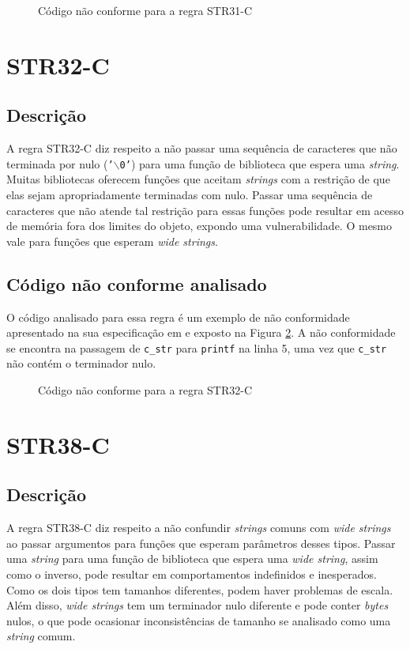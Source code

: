 \begin{figure}[h!]
  \centering
  
  \caption{Código não conforme para a regra STR31-C}
\label{fig:STR31-C}
\end{figure}

\section{STR32-C}
\subsection{Descrição}

A regra STR32-C diz respeito a não passar uma sequência de caracteres que não terminada por nulo (\texttt{'$\backslash$0'}) para uma função de biblioteca que espera uma \textit{string}. Muitas bibliotecas oferecem funções que aceitam \textit{strings} com a restrição de que elas sejam apropriadamente terminadas com nulo. Passar uma sequência de caracteres que não atende tal restrição para essas funções pode resultar em acesso de memória fora dos limites do objeto, expondo uma vulnerabilidade. O mesmo vale para funções que esperam \textit{wide strings}.

\subsection{Código não conforme analisado}

O código analisado para essa regra é um exemplo de não conformidade apresentado na sua especificação em \cite{ccert} e exposto na Figura \ref{fig:STR32-C}. A não conformidade se encontra na passagem de \texttt{c\_str} para \texttt{printf} na linha 5, uma vez que \texttt{c\_str} não contém o terminador nulo.

\begin{figure}[h!]
  \centering
  
  \caption{Código não conforme para a regra STR32-C}
\label{fig:STR32-C}
\end{figure}

\section{STR38-C}
\subsection{Descrição}

A regra STR38-C diz respeito a não confundir \textit{strings} comuns com \textit{wide strings} ao passar argumentos para funções que esperam parâmetros desses tipos. Passar uma \textit{string} para uma função de biblioteca que espera uma \textit{wide string}, assim como o inverso, pode resultar em comportamentos indefinidos e inesperados. Como os dois tipos tem tamanhos diferentes, podem haver problemas de escala. Além disso, \textit{wide strings} tem um terminador nulo diferente e pode conter \textit{bytes} nulos, o que pode ocasionar inconsistências de tamanho se analisado como uma \textit{string} comum.

